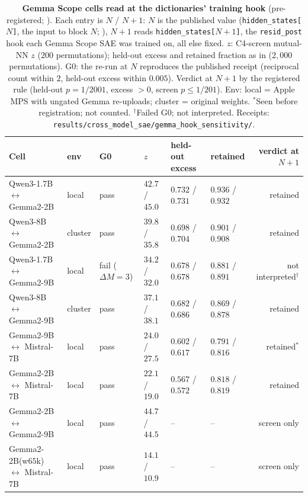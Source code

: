 \begin{table}[h]
\centering
\caption{\textbf{Gemma Scope cells read at the dictionaries' training hook} (pre-registered;
). Each entry is $N$ / $N{+}1$: $N$ is the published value
(\texttt{hidden\_states[$N$]}, the input to block $N$; ),
$N{+}1$ reads \texttt{hidden\_states[$N{+}1$]}, the \texttt{resid\_post} hook each Gemma Scope
SAE was trained on, all else fixed. $z$: C4-screen mutual-NN $z$ ($200$ permutations); held-out
excess and retained fraction as in  ($2{,}000$ permutations). G0: the
re-run at $N$ reproduces the published receipt (reciprocal count within $2$, held-out excess
within $0.005$). Verdict at $N{+}1$ by the registered rule (held-out $p=1/2001$, excess $>0$,
screen $p\le1/201$). Env: local = Apple MPS with ungated Gemma re-uploads; cluster = original
weights. $^{*}$Seen before registration; not counted. $^{\dagger}$Failed G0; not interpreted.
Receipts: \texttt{results/cross\_model\_sae/gemma\_hook\_sensitivity/}.}
\label{tab:gemmahook}
\scriptsize
\setlength{\tabcolsep}{2.5pt}
\begin{tabular}{llllllr}
\toprule
Cell & env & G0 & $z$ & held-out excess & retained & verdict at $N{+}1$ \\
\midrule
Qwen3-1.7B $\leftrightarrow$ Gemma2-2B & local & pass & $42.7$ / $45.0$ & $0.732$ / $0.731$ & $0.936$ / $0.932$ & retained \\
Qwen3-8B $\leftrightarrow$ Gemma2-2B & cluster & pass & $39.8$ / $35.8$ & $0.698$ / $0.704$ & $0.901$ / $0.908$ & retained \\
Qwen3-1.7B $\leftrightarrow$ Gemma2-9B & local & fail ($\Delta M{=}3$) & $34.2$ / $32.0$ & $0.678$ / $0.678$ & $0.881$ / $0.891$ & not interpreted$^{\dagger}$ \\
Qwen3-8B $\leftrightarrow$ Gemma2-9B & cluster & pass & $37.1$ / $38.1$ & $0.682$ / $0.686$ & $0.869$ / $0.878$ & retained \\
Gemma2-9B $\leftrightarrow$ Mistral-7B & local & pass & $24.0$ / $27.5$ & $0.602$ / $0.617$ & $0.791$ / $0.816$ & retained$^{*}$ \\
Gemma2-2B $\leftrightarrow$ Mistral-7B & local & pass & $22.1$ / $19.0$ & $0.567$ / $0.572$ & $0.818$ / $0.819$ & retained \\
\midrule
Gemma2-2B $\leftrightarrow$ Gemma2-9B & local & pass & $44.7$ / $44.5$ & -- & -- & screen only \\
Gemma2-2B(w$65$k) $\leftrightarrow$ Mistral-7B & local & pass & $14.1$ / $10.9$ & -- & -- & screen only \\
\bottomrule
\end{tabular}
\end{table}

